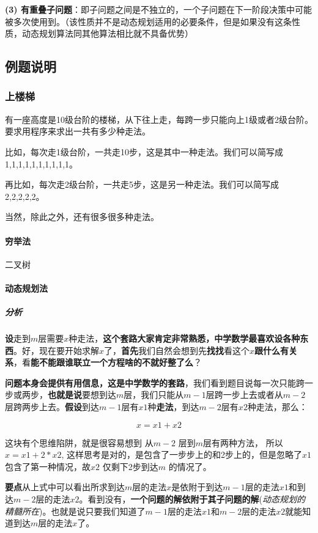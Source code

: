 \documentclass[UTF8,a4paper,12pt]{ctexbook}
\begin{document}
			\textbf{(3) 有重叠子问题}：即子问题之间是不独立的，一个子问题在下一阶段决策中可能被多次使用到。（该性质并不是动态规划适用的必要条件，但是如果没有这条性质，动态规划算法同其他算法相比就不具备优势）
			
		\subsection{例题说明}
			\subsubsection{上楼梯}
				有一座高度是10级台阶的楼梯，从下往上走，每跨一步只能向上1级或者2级台阶。要求用程序来求出一共有多少种走法。
				
				比如，每次走1级台阶，一共走10步，这是其中一种走法。我们可以简写成 1,1,1,1,1,1,1,1,1,1。
				
				再比如，每次走2级台阶，一共走5步，这是另一种走法。我们可以简写成 2,2,2,2,2。
				
				当然，除此之外，还有很多很多种走法。
			
			\paragraph{穷举法}
				二叉树
			\paragraph{动态规划法}
				\subparagraph{分析}
					\textbf{设}走到$m$层需要$x$种走法，\textbf{这个套路大家肯定非常熟悉，中学数学最喜欢设各种东西}。好，现在要开始求解$x$了，\textbf{首先}我们自然会想到先\textbf{找找}看这个$x$\textbf{跟什么有关系}，看\textbf{能不能跟谁联立一个方程啥的不就好整了么}？
					
					\textbf{问题本身会提供有用信息，这是中学数学的套路}，我们看到题目说每一次只能跨一步或两步，\textbf{也就是说}要想到达$m$层，我们只能从$m-1$层跨一步上去或者从$m-2$层跨两步上去。\textbf{假设}到达$m-1$层有$x1$种\textbf{走法}，到达$m-2$层有$x2$种走法，那么：
					
					$$x = x1 + x2$$
					
					这块有个思维陷阱，就是很容易想到 从$m-2$ 层到$m$层有两种方法， 所以 $x = x1 + 2*x2$, 这样思考是对的，是包含了一步步上的和2步上的，但是忽略了$x1$ 包含了第一种情况，故$x2$ 仅剩下2步到达$m$ 的情况了。
					
					\textbf{要点}从上式中可以看出所求到达$m$层的走法$x$是依附于到达$m-1$层的走法$x1$和到达$m-2$层的走法$x2$。看到没有，\textbf{一个问题的解依附于其子问题的解}(\textit{动态规划的精髓所在})。也就是说只要我们知道了$m-1$层的走法$x1$和$m-2$层的走法$x2$就能知道到达$m$层的走法$x$了。
			
\end{document}

